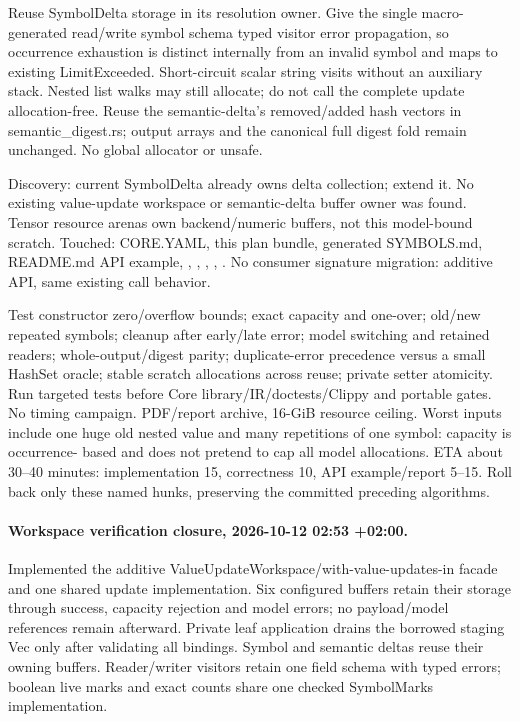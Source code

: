 \documentclass[11pt,a4paper]{article}
\begin{document}
Reuse SymbolDelta storage in its resolution owner. Give the single macro-generated
read/write symbol schema typed visitor error propagation, so occurrence exhaustion
is distinct internally from an invalid symbol and maps to existing LimitExceeded.
Short-circuit scalar string visits without an auxiliary stack. Nested list walks
may still allocate; do not call the complete update allocation-free. Reuse the
semantic-delta's removed/added hash vectors in semantic\_digest.rs; output arrays
and the canonical full digest fold remain unchanged. No global allocator or unsafe.

Discovery: current SymbolDelta already owns delta collection; extend it.
No existing value-update workspace or semantic-delta buffer owner was found.
Tensor resource arenas own backend/numeric buffers, not this model-bound scratch.
Touched: CORE.YAML, this plan bundle, generated SYMBOLS.md, README.md API example,
,
,
,
, .
No consumer signature migration: additive API, same existing call behavior.

Test constructor zero/overflow bounds; exact capacity and one-over; old/new repeated
symbols; cleanup after early/late error; model switching and retained readers;
whole-output/digest parity; duplicate-error precedence versus a small HashSet
oracle; stable scratch allocations across reuse; private setter atomicity. Run
targeted tests before Core library/IR/doctests/Clippy and portable gates. No timing
campaign. PDF/report archive, 16-GiB resource ceiling. Worst inputs include one
huge old nested value and many repetitions of one symbol: capacity is occurrence-
based and does not pretend to cap all model allocations. ETA about 30--40 minutes:
implementation 15, correctness 10, API example/report 5--15. Roll back only these
named hunks, preserving the committed preceding algorithms.

\paragraph{Workspace verification closure, 2026-10-12 02:53 +02:00.}
Implemented the additive ValueUpdateWorkspace/with-value-updates-in facade and
one shared update implementation. Six configured buffers retain their storage
through success, capacity rejection and model errors; no payload/model references
remain afterward. Private leaf application drains the borrowed staging Vec only
after validating all bindings. Symbol and semantic deltas reuse their owning
buffers. Reader/writer visitors retain one field schema with typed errors;
boolean live marks and exact counts share one checked SymbolMarks implementation.
\end{document}
